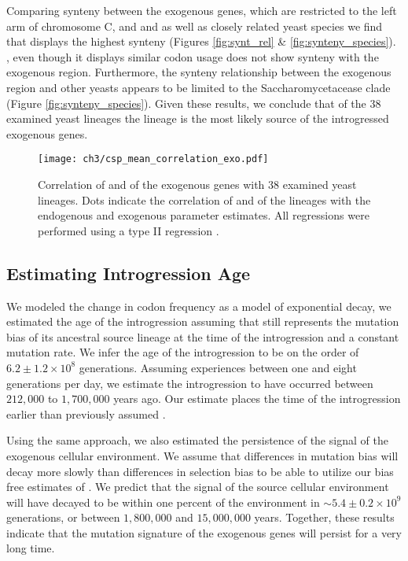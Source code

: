 Comparing synteny between the exogenous genes, which are restricted to the left arm of chromosome C, and \gossypii and \dubl as well as closely related yeast species we find that \gossypii displays the highest synteny (Figures \ref{fig:synt_rel} \& \ref{fig:synteny_species}).
\dubl, even though it displays similar codon usage does not show synteny with the exogenous region.
Furthermore, the synteny relationship between the exogenous region and other yeasts appears to be limited to the Saccharomycetacease clade (Figure \ref{fig:synteny_species}).
Given these results, we conclude that of the 38 examined yeast lineages the \gossypii lineage is the most likely source of the introgressed exogenous genes.

\singlespacing
\begin{figure}
     \centering
	\texttt{[image: ch3/csp\_mean\_correlation\_exo.pdf]}
	\caption{Correlation of \DM and \DE of the exogenous genes with 38 examined yeast lineages. 
	Dots indicate the correlation of \DM and \DE of the lineages with the endogenous and exogenous parameter estimates. 
	All regressions were performed using a type II regression \citep{SokalAndRohlf1981}.}
	\label{fig:csp_exo_comp}
\end{figure}
\doublespacing

\subsection{Estimating Introgression Age}

We modeled the change in codon frequency as a model of exponential decay, we estimated the age of the introgression assuming that \gossypii still represents the mutation bias of its ancestral source lineage at the time of the introgression and a constant mutation rate.
We infer the age of the introgression to be on the order of $6.2\pm1.2\times 10^8$ generations. 
Assuming \kluyveri experiences between one and eight generations per day, we estimate the introgression to have occurred between $212,000$ to $1,700,000$ years ago.
Our estimate places the time of the introgression earlier than previously assumed \citep{friedrich2015}.

Using the same approach, we also estimated the persistence of the signal of the exogenous cellular environment.
We assume that differences in mutation bias will decay more slowly than differences in selection bias to be able to utilize our bias free estimates of \DM.
We predict that the \DM signal of the source cellular environment will have decayed to be within one percent of the \kluyveri environment in $\sim 5.4\pm0.2\times 10^9 $ generations, or between $1,800,000$ and $15,000,000$ years.
Together, these results indicate that the mutation signature of the exogenous genes will persist for a very long time.

